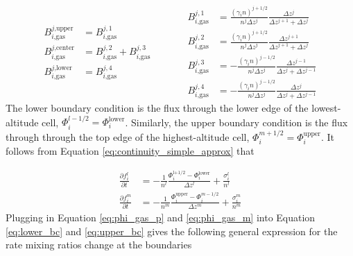 \begin{equation*}
\begin{aligned}
  B_{i\text{,gas}}^{j\text{,upper}} &= B_{i\text{,gas}}^{j,1} \\
  B_{i\text{,gas}}^{j\text{,center}} &= B_{i\text{,gas}}^{j,2} + B_{i\text{,gas}}^{j,3} \\
  B_{i\text{,gas}}^{j\text{,lower}} &= B_{i\text{,gas}}^{j,4}
\end{aligned}
\quad\quad\quad
\begin{aligned}
  B_{i\text{,gas}}^{j,1} &= \frac{(\gamma_{i} n)^{j+1/2}}{n^j \Delta z^j} \frac{\Delta z^{j}}{\Delta z^{j+1}+\Delta z^{j}} \\
  B_{i\text{,gas}}^{j,2} &= \frac{(\gamma_{i} n)^{j+1/2}}{n^j \Delta z^j} \frac{\Delta z^{j+1}}{\Delta z^{j+1}+\Delta z^{j}} \\
  B_{i\text{,gas}}^{j,3} &= - \frac{(\gamma_{i} n)^{j-1/2}}{n^j \Delta z^j} \frac{\Delta z^{j-1}}{\Delta z^{j}+\Delta z^{j-1}} \\
  B_{i\text{,gas}}^{j,4} &= - \frac{(\gamma_{i} n)^{j-1/2}}{n^j \Delta z^j} \frac{\Delta z^{j}}{\Delta z^{j}+\Delta z^{j-1}} 
\end{aligned}
\end{equation*}
The lower boundary condition is the flux through the lower edge of the lowest-altitude cell, $\Phi_{i}^{l-1/2} = \Phi_{i}^\text{lower}$. Similarly, the upper boundary condition is the flux through through the top edge of the highest-altitude cell, $\Phi_{i}^{m+1/2} = \Phi_{i}^\text{upper}$. It follows from Equation \eqref{eq:continuity_simple_approx} that

\begin{align}
  \frac{\partial f_i^l}{\partial t} &= - \frac{1}{n^{l}} \frac{\Phi_{i}^\text{l+1/2} - \Phi_{i}^\text{lower}}{\Delta z^l} + \frac{\sigma_i^l}{n^{l}} \label{eq:lower_bc} \\
  \frac{\partial f_i^m}{\partial t} &= - \frac{1}{n^{m}} \frac{\Phi_{i}^\text{upper} - \Phi_{i}^{m-1/2}}{\Delta z^m} + \frac{\sigma_i^m}{n^{m}} \label{eq:upper_bc}
\end{align}
Plugging in Equation \eqref{eq:phi_gas_p} and \eqref{eq:phi_gas_m} into Equation \eqref{eq:lower_bc} and \eqref{eq:upper_bc} gives the following general expression for the rate mixing ratios change at the boundaries

